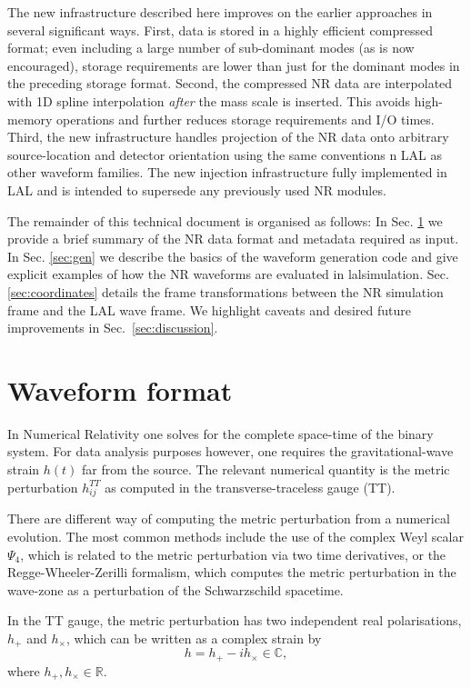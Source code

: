 \documentclass[11pt,tightenlines,article,amssymb,amsmath,amsfonts,superscriptaddress]{revtex4}
\begin{document}
The new infrastructure described here improves on the earlier approaches
in several significant ways. First, data is stored in a highly efficient compressed format;  even including a large number of sub-dominant modes (as is now encouraged), storage requirements are lower than just for the dominant modes in the preceding storage format.  
Second, the compressed NR data are interpolated with 1D spline interpolation \emph{after} the mass scale is inserted. This avoids high-memory operations and further reduces storage requirements and I/O times.  Third, the new infrastructure handles projection of the NR data onto
arbitrary source-location and detector orientation using the same conventions
n LAL as other waveform families.
The new injection infrastructure fully implemented in LAL and is intended to supersede any previously used NR modules.

The remainder of this technical document is organised as follows: In Sec. \ref{sec:format} we provide a brief summary
of the NR data format and metadata required as input. In Sec. \ref{sec:gen} we describe the basics of the waveform generation code and give explicit examples of how the NR waveforms are evaluated in lalsimulation. Sec. \ref{sec:coordinates} details the frame transformations between the NR simulation frame and the LAL wave frame. We highlight caveats and desired future improvements in Sec.~\ref{sec:discussion}.

\section{Waveform format}
\label{sec:format}
In Numerical Relativity one solves for the complete space-time of the binary system. For data analysis
purposes however, one requires the gravitational-wave strain $h(t)$ far from the source. The relevant numerical quantity
is the metric perturbation $h^{TT}_{ij}$ as computed in the transverse-traceless gauge (TT). 

There are different way of computing the metric perturbation from a numerical evolution. The most common methods include
the use of the complex Weyl scalar $\Psi_4$, which is related to the metric perturbation via two time derivatives, or the
Regge-Wheeler-Zerilli formalism, which computes the metric perturbation in the wave-zone as a perturbation of the Schwarzschild
spacetime. 

In the TT gauge, the metric perturbation
has two independent real polarisations, $h_+$ and $h_\times$, which can be written as a complex strain by
\begin{equation}
\label{ }
h = h_+ - i h_\times \in \mathbb{C},
\end{equation}
where $h_+, h_\times \in \mathbb{R}$. \\
\end{document}
